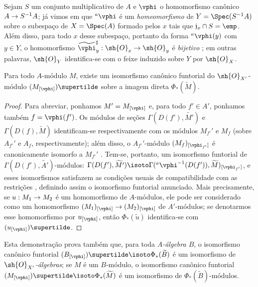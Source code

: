 \documentclass[oneside]{amsart}
\makeatletter
\newcommand{\ega@arrow}[2]{\mathchoice{#1}{#2}{#2}{#2}}
\renewcommand{\to}{\ega@arrow{\longrightarrow}{\rightarrow}}
\newcommand{\oldpage}[2][]{{\marginnote{\normalfont\textbf{#1}~|~#2}}\ignorespaces}
\let\EGAOriginalLabel\label
\renewcommand{\label}[1]{\phantomsection\EGAOriginalLabel{#1}}
\makeatother
\begin{document}
\begin{example}[1.6.2]
\label{I.1.6.2}
Sejam $S$ um conjunto multiplicativo de $A$ e $\vphi$ o homomorfismo canônico $A\to S^{-1}A$;
já vimos em  que ${}^a\vphi$ é um \emph{homeomorfismo} de $Y=\Spec(S^{-1}A)$ sobre o subespaço de $X=\Spec(A)$ formado pelos $x$ tais que $\mathfrak{j}_x\cap S=\emp$.
Além disso, para todo $x$ desse subespaço, portanto da forma ${}^a\vphi(y)$ com $y\in Y$, o homomorfismo $\widetilde{\vphi}_y^\sharp:\sh{O}_x\to\sh{O}_y$ é
\emph{bijetivo} ;
em outras palavras, $\sh{O}_Y$ identifica-se com o feixe induzido sobre $Y$ por $\sh{O}_X$.
\end{example}

\begin{proposition}[1.6.3]
\label{I.1.6.3}
Para todo $A$-módulo $M$, existe um isomorfismo canônico funtorial do
$\sh{O}_{X'}$-módulo $(M_{[\vphi]})\supertilde$ sobre a imagem direta
$\Phi_*(\widetilde{M})$.
\end{proposition}

\begin{proof}
Para abreviar, ponhamos $M'=M_{[\vphi]}$ e, para todo $f'\in A'$, ponhamos
também $f=\vphi(f')$.
Os módulos de seções $\Gamma(D(f'),\widetilde{M'})$ e
$\Gamma(D(f),\widetilde{M})$ identificam-se respectivamente com os módulos
$M_{f'}'$ e $M_f$ (sobre $A_{f'}'$ e $A_f$, respectivamente); além disso, o
$A_{f'}'$-módulo $(M_f)_{[\vphi_{f'}]}$ é canonicamente isomorfo a $M_{f'}'$
.
Tem-se, portanto, um isomorfismo funtorial de
$\Gamma(D(f'),\widetilde{A'})$-módulos:
$\Gamma(D(f'),\widetilde{M'})\isoto
\Gamma({}^a\vphi^{-1}(D(f')),\widetilde{M})_{[\vphi_{f'}]}$, e esses
isomorfismos satisfazem as condições usuais de compatibilidade com as
restrições , definindo assim o isomorfismo funtorial anunciado.
Mais precisamente, se $u:M_1\to M_2$ é um homomorfismo de $A$-módulos, ele
pode ser considerado como um homomorfismo
$(M_1)_{[\vphi]}\to(M_2)_{[\vphi]}$ de $A'$-módulos; se denotarmos esse
homomorfismo por $u_{[\vphi]}$, então $\Phi_*(\widetilde{u})$ identifica-se com
$(u_{[\vphi]})\supertilde$.
\end{proof}

Esta demonstração prova também que, para toda \emph{$A$-álgebra $B$}, o
isomorfismo canônico funtorial
\oldpage[I]{95}
$(B_{[\vphi]})\supertilde\isoto\Phi_*(\widetilde{B})$ é um isomorfismo de
\emph{$\sh{O}_{X'}$-álgebras}; se $M$ é um $B$-módulo, o isomorfismo canônico
funtorial
$(M_{[\vphi]})\supertilde\isoto\Phi_*(\widetilde{M})$ é um isomorfismo de
$\Phi_*(\widetilde{B})$-módulos.
\end{document}
